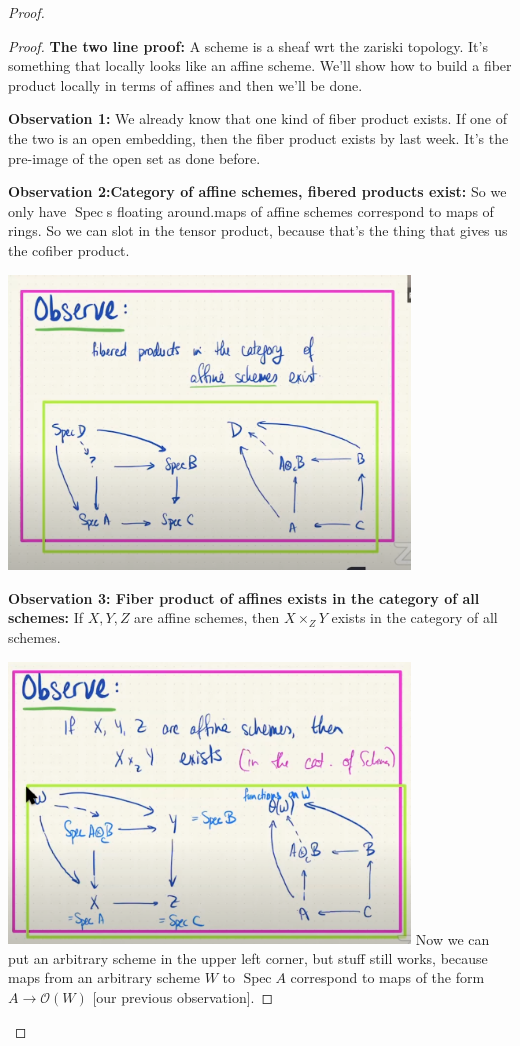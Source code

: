 \documentclass{book}
\renewcommand{\O}{\ensuremath{\mathcal{O}}}
\newcommand{\spec}{\operatorname{Spec}}
\theoremstyle{definition}
\begin{document}
\begin{proof}
\begin{proof}
\textbf{The two line proof:}
A scheme is a sheaf wrt the zariski topology. It's something that locally looks
like an affine scheme. We'll show how to build a fiber product locally in terms
of affines and then we'll be done.

\textbf{Observation 1:} We already know that one kind of fiber product exists.
If one of the two is an open embedding, then the fiber product exists by last week.
It's the pre-image of the open set as done before.

\textbf{Observation 2:Category of affine schemes, fibered products exist:} So we 
only have $\spec$s floating around.maps of affine schemes correspond to maps of
rings. So we can slot in the tensor product, because that's the thing that gives
us the cofiber product.

\includegraphics[width=0.8\textwidth]{fibered-products-affine-schemes-exist.png}

\textbf{Observation 3: Fiber product of affines exists in the category of all schemes:}
If $X, Y, Z$ are affine schemes, then $X \times_Z Y$ exists in the category
of all schemes.

\includegraphics[width=0.8\textwidth]{fibered-products-of-affines-in-category-of-schemes-exist.png}
Now we can put an arbitrary scheme in the upper left corner, but stuff still works,
because maps from an arbitrary scheme $W$ to $\spec A$
correspond to maps of the form $A \rightarrow \O(W)$ [our previous observation].


\end{proof}
\end{proof}
\end{document}
